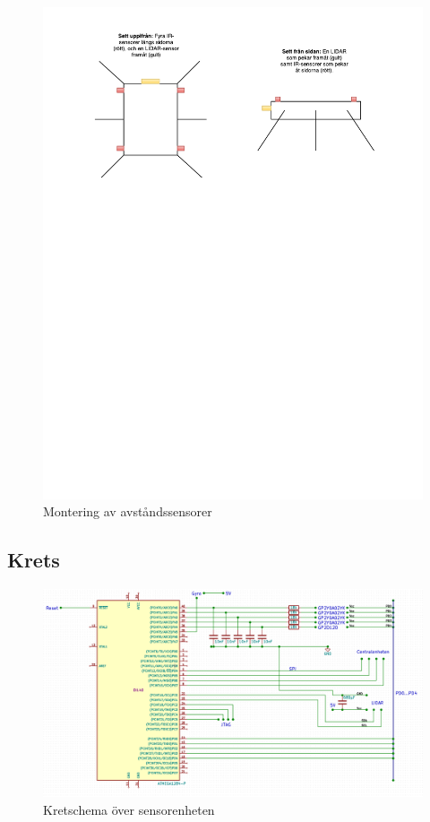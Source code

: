 \documentclass[a4paper,titlepage,12pt]{article}
\begin{document}
    \begin{figure}[h]
        \includegraphics[width=17cm, trim=2cm 18cm 0cm 0cm]{images/sensor_mount.pdf}
        \caption{Montering av avståndssensorer\label{fig:sensor_mount}}
    \end{figure}

    \newpage
    \subsection{Krets}

    \begin{figure}[h]
        \includegraphics[width=15cm]{images/schematic_sensor.png}
        \caption{Kretschema över sensorenheten\label{fig:schem_sensor}}
    \end{figure}
    
\end{document}

